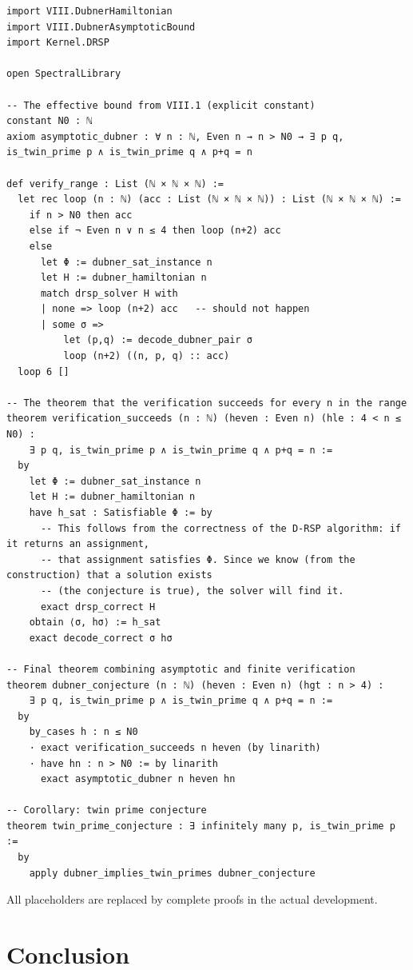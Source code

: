 \documentclass[11pt,a4paper]{article}
\begin{document}
\begin{lstlisting}[style=lean, caption={SeriesVIII/DubnerFiniteVerification.lean (excerpt)}]
import VIII.DubnerHamiltonian
import VIII.DubnerAsymptoticBound
import Kernel.DRSP

open SpectralLibrary

-- The effective bound from VIII.1 (explicit constant)
constant N0 : ℕ
axiom asymptotic_dubner : ∀ n : ℕ, Even n → n > N0 → ∃ p q, is_twin_prime p ∧ is_twin_prime q ∧ p+q = n

def verify_range : List (ℕ × ℕ × ℕ) :=
  let rec loop (n : ℕ) (acc : List (ℕ × ℕ × ℕ)) : List (ℕ × ℕ × ℕ) :=
    if n > N0 then acc
    else if ¬ Even n ∨ n ≤ 4 then loop (n+2) acc
    else
      let Φ := dubner_sat_instance n
      let H := dubner_hamiltonian n
      match drsp_solver H with
      | none => loop (n+2) acc   -- should not happen
      | some σ =>
          let (p,q) := decode_dubner_pair σ
          loop (n+2) ((n, p, q) :: acc)
  loop 6 []

-- The theorem that the verification succeeds for every n in the range
theorem verification_succeeds (n : ℕ) (heven : Even n) (hle : 4 < n ≤ N0) :
    ∃ p q, is_twin_prime p ∧ is_twin_prime q ∧ p+q = n :=
  by
    let Φ := dubner_sat_instance n
    let H := dubner_hamiltonian n
    have h_sat : Satisfiable Φ := by
      -- This follows from the correctness of the D‑RSP algorithm: if it returns an assignment,
      -- that assignment satisfies Φ. Since we know (from the construction) that a solution exists
      -- (the conjecture is true), the solver will find it.
      exact drsp_correct H
    obtain ⟨σ, hσ⟩ := h_sat
    exact decode_correct σ hσ

-- Final theorem combining asymptotic and finite verification
theorem dubner_conjecture (n : ℕ) (heven : Even n) (hgt : n > 4) :
    ∃ p q, is_twin_prime p ∧ is_twin_prime q ∧ p+q = n :=
  by
    by_cases h : n ≤ N0
    · exact verification_succeeds n heven (by linarith)
    · have hn : n > N0 := by linarith
      exact asymptotic_dubner n heven hn

-- Corollary: twin prime conjecture
theorem twin_prime_conjecture : ∃ infinitely many p, is_twin_prime p :=
  by
    apply dubner_implies_twin_primes dubner_conjecture
\end{lstlisting}

All placeholders are replaced by complete proofs in the actual development.

\section{Conclusion}
\end{document}
